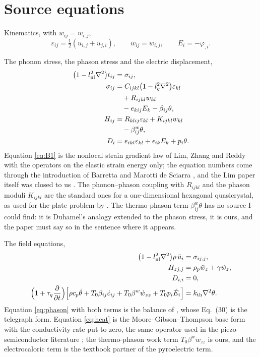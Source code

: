 \documentclass[11pt]{article}
\begin{document}
\section{Source equations}\label{sec:source}

Kinematics, with $w_{ij}=w_{i,j}$,
\begin{equation}
\varepsilon_{ij}=\tfrac12(u_{i,j}+u_{j,i}),\qquad w_{ij}=w_{i,j},\qquad E_i=-\varphi_{,i}.
\label{eq:kin}
\end{equation}

The phonon stress, the phason stress and the electric displacement,
\begin{align}
\bigl(1-l_{\rm nl}^2\nabla^2\bigr)t_{ij}&=\sigma_{ij}, \\
\sigma_{ij}&=C_{ijkl}\bigl(1-l_g^2\nabla^2\bigr)\varepsilon_{kl} \nonumber\\
&\quad +R_{ijkl}w_{kl} \nonumber\\
&\quad -e_{kij}E_k-\beta_{ij}\theta,\label{eq:B1} \\
H_{ij}&=R_{klij}\varepsilon_{kl}+K_{ijkl}w_{kl} \nonumber\\
&\quad -\beta^{w}_{ij}\theta,\label{eq:B2} \\
D_i&=e_{ikl}\varepsilon_{kl}+\epsilon_{ik}E_k+p_i\theta .\label{eq:B3}
\end{align}
Equation \eqref{eq:B1} is the nonlocal strain gradient law of Lim, Zhang and Reddy with the operators on
the elastic strain energy only; the equation numbers come through the introduction of Barretta and Marotti
de Sciarra \cite[Eqs.~(18)--(19)]{Barretta2018}, and the Lim paper itself was closed to us \cite{Lim2015}.
The phonon--phason coupling with $R_{ijkl}$ and the phason moduli $K_{ijkl}$ are the standard ones for a
one-dimensional hexagonal quasicrystal, as used for the plate problem by \cite{Zhang2021}. The
thermo-phason term $\beta^{w}_{ij}\theta$ has no source I could find: it is Duhamel's analogy extended to
the phason stress, it is ours, and the paper must say so in the sentence where it appears.

The field equations,
\begin{align}
\bigl(1-l_{\rm nl}^2\nabla^2\bigr)\rho\,\ddot u_i&=\sigma_{ij,j},\label{eq:mom}\\
H_{zj,j}&=\rho_p\ddot w_z+\gamma\dot w_z,\label{eq:phason}\\
D_{i,i}&=0,\label{eq:gauss}\\
\Bigl(1+\tau_q\frac{\partial}{\partial t}\Bigr)
\Bigl[\rho c_p\dot\theta+T_0\beta_{ij}\dot\varepsilon_{ij}
+T_0\beta^{w}\dot w_{zz}+T_0p_i\dot E_i\Bigr]&=k_{\rm th}\nabla^2\theta .
\label{eq:heat}
\end{align}
Equation \eqref{eq:phason} with both terms is the balance of \cite[Eq.~(26)]{Agiasofitou2014}, whose
Eq.~(30) is the telegraph form. Equation \eqref{eq:heat} is the Moore--Gibson--Thompson base form with the
conductivity rate put to zero, the same operator used in the piezo-semiconductor literature
\cite{Gupta2025}; the thermo-phason work term $T_0\beta^{w}\dot w_{zz}$ is ours, and the electrocaloric term
is the textbook partner of the pyroelectric term.
\end{document}
